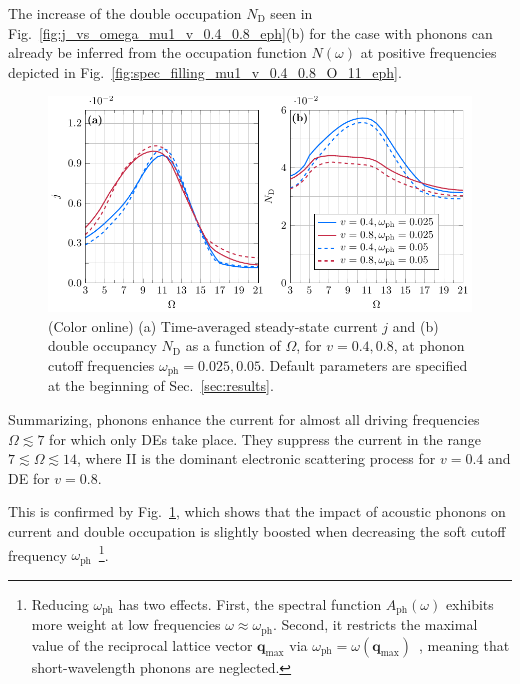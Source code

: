 \documentclass[aps,prb,groupedaddress,showpacs,twocolumn,superscriptaddress,10pt]{revtex4-2}
\renewcommand{\vec}[1]{\bm{#1}} %
\begin{document}
The increase of the double occupation $N_{\text{D}}$ seen in Fig.~\ref{fig:j_vs_omega_mu1_v_0.4_0.8_eph}(b) for the case with phonons can already be inferred from the occupation function $N(\omega)$ at positive frequencies depicted in Fig.~\ref{fig:spec_filling_mu1_v_0.4_0.8_O_11_eph}.

 
\begin{figure}[b] 
\includegraphics[width=\linewidth]{./figures_Paper1/j_vs_omega_mu1_v_0.4_0.8_E0_2_sweep_omegaph.pdf}
\caption{(Color online) (a) Time-averaged steady-state current $j$ and (b) double occupancy $N_{\text{D}}$ as a function of $\Omega$, for $v=0.4, 0.8$, at phonon cutoff frequencies $\omega_{\text{ph}}=0.025, 0.05$. Default parameters are specified at the beginning of Sec.~\ref{sec:results}.} 
\label{fig:j_vs_omega_mu1_v_0.4_0.8_E0_2_sweep_omegaph}
\end{figure}

Summarizing, phonons enhance the current for almost all driving frequencies $\Omega\lesssim 7$ for which only DEs take place. They suppress the current in the range $7\lesssim\Omega\lesssim14$, where II is the dominant electronic scattering process for $v=0.4$ and DE for $v=0.8$. 

% 
  
This is confirmed by Fig.~\ref{fig:j_vs_omega_mu1_v_0.4_0.8_E0_2_sweep_omegaph}, which shows that the impact of acoustic phonons on current and double occupation is slightly boosted when decreasing the soft cutoff frequency $\omega_{\text{ph}}$~\footnote{Reducing $\omega_{\text{ph}}$ has two effects. First, the spectral function $A_{\text{ph}}(\omega)$ exhibits more weight at low frequencies $\omega\approx\omega_{\text{ph}}$. Second, it restricts the maximal value of the reciprocal lattice vector $\vec{q}_{\text{max}}$ via $\omega_{\text{ph}}=\omega(\vec{q}_{\text{max}})$~\cite{ma.ga.22u}, meaning that short-wavelength phonons are neglected.}.
  
\end{document}
